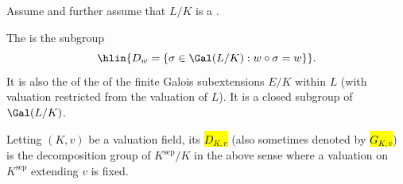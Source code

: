 \begin{definition} \label{definition:decomposition_group_of_a_general_galois_extension_of_valuation_fields}
    Assume  and further assume that $L/K$ is a .

    The  is the subgroup 
    $$\hlin{D_w = \{\sigma \in \Gal(L/K) : w \circ \sigma = w\}}.$$
     It is also the  of the  of the finite Galois subextensions $E/K$ within $L$ (with valuation restricted from the valuation of $L$). It is a closed subgroup of $\Gal(L/K)$.

    Letting $(K,v)$ be a valuation field, its  \hl{$D_{K,v}$} (also sometimes denoted by \hl{$G_{K,v}$}) is the decomposition group of $K^{\text{sep}} / K$ in the above sense where a valuation on $K^{\text{sep}}$ extending $v$ is fixed.

\end{definition}